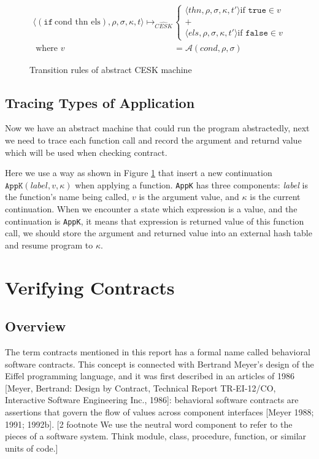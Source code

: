 \documentclass[paper=a4, fontsize=11pt]{scrartcl} %
\numberwithin{equation}{section} %
\numberwithin{figure}{section} %
\numberwithin{table}{section} %
\begin{document}
\begin{figure}[h!]
\begin{align*}
\langle (\texttt{if}~\text{cond thn els}), \rho, \sigma, \kappa, t \rangle \longmapsto_{\widehat{CESK}} &
\begin{cases}
\langle thn, \rho, \sigma, \kappa, t' \rangle \text{if } \texttt{true} \in v \\
+ \\
\langle els, \rho, \sigma, \kappa, t' \rangle \text{if } \texttt{false} \in v
\end{cases} \\
\text{ where } v & = \mathcal{A}(cond, \rho, \sigma)
\end{align*}
\caption{Transition rules of abstract CESK machine}
\label{fig:transabs}
\end{figure}

\subsection{Tracing Types of Application}

Now we have an abstract machine that could run the program abstractedly, next we need to trace each function call and record the argument and returnd value which will be used when checking contract. 

Here we use a way as shown in Figure \ref{fig:transabs} that insert a new continuation $\texttt{AppK}(label, v, \kappa)$ when applying a function. \texttt{AppK} has three components: \textit{label} is the function's name being called, $v$ is the argument value, and $\kappa$ is the current continuation. When we encounter a state which expression is a value, and the continuation is \texttt{AppK}, it means that expression is returned value of this function call, we should store the argument and returned value into an external hash table and resume program to $\kappa$.



\section{Verifying Contracts}

\subsection{Overview}
The term contracts mentioned in this report has a formal name called behavioral software contracts. This concept is connected with Bertrand Meyer's design of the Eiffel programming language, and it was first described in an articles of 1986 [Meyer, Bertrand: Design by Contract, Technical Report TR-EI-12/CO, Interactive Software Engineering Inc., 1986]: behavioral software contracts are assertions that govern the flow of values across component interfaces [Meyer 1988; 1991; 1992b].
[2 footnote We use the neutral word component to refer to the pieces of a software system. Think module, class, procedure, function, or similar units of code.]
\end{document}
